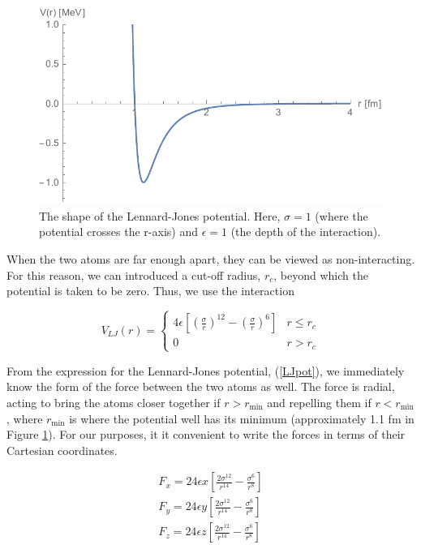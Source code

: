 \documentclass{article}
\begin{document}
\begin{multicols}{2}
\begin{figure}[H]
\begin{center}
\includegraphics[width=\linewidth]{plots/VLJ.pdf}
\caption{The shape of the Lennard-Jones potential.  Here, $\sigma=1$ (where the potential crosses the r-axis) and $\epsilon =1$ (the depth of the interaction).}
\label{VLJfig}
\end{center}
\end{figure}

When the two atoms are far enough apart, they can be viewed as non-interacting.  For this reason, we can introduced a cut-off radius, $r_c$, beyond which the potential is taken to be zero.  Thus, we use the interaction 

\begin{equation}
V_{LJ} (r) = \begin{cases}
4 \epsilon \left [ \left (\frac{\sigma}{r} \right )^{12} - \left (\frac{\sigma}{r} \right )^{6} \right ] & r \le r_c \\
0 & r > r_c
\end{cases}
\end{equation}

From the expression for the Lennard-Jones potential, (\ref{LJpot}), we immediately know the form of the force between the two atoms as well.  The force is radial, acting to bring the atoms closer together if $r > r_{\mathrm{min}}$ and repelling them if $r < r_{\mathrm{min}}$, where $r_{\mathrm{min}}$ is where the potential well has its minimum (approximately 1.1 fm in Figure \ref{VLJfig}).  For our purposes, it it convenient to write the forces in terms of their Cartesian coordinates.  

\begin{equation}
\begin{split}
F_x = 24\epsilon x \left [ \frac{2 \sigma ^{12}}{r^{14}} - \frac{\sigma ^{6}}{r^8} \right ] \\
F_y = 24 \epsilon y \left [ \frac{2 \sigma ^{12}}{r^{14}} - \frac{\sigma ^{6}}{r^8} \right ] \\
F_z = 24 \epsilon z \left [ \frac{2 \sigma ^{12}}{r^{14}} - \frac{\sigma ^{6}}{r^8} \right ] \\
\end{split}
\end{equation}


\end{multicols}
\end{document}
